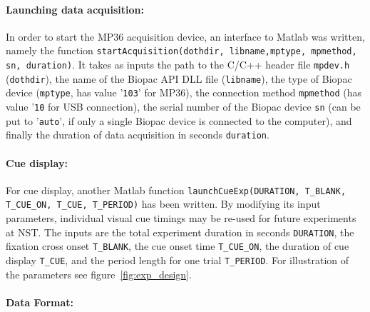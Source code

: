 \documentclass[a4paper,twoside, openright,12pt]{report}
\begin{document}
\paragraph{Launching data acquisition:} In order to start the MP36 acquisition device, an interface to Matlab was written, namely the function \texttt{startAcquisition(dothdir, libname,mptype, mpmethod, sn, duration)}. It takes as inputs the path to the C/C++ header file \texttt{mpdev.h} (\texttt{dothdir}), the name of the Biopac API DLL file (\texttt{libname}), the type of Biopac device (\texttt{mptype}, has value '\texttt{103}' for MP36), the connection method \texttt{mpmethod} (has value '\texttt{10} for USB connection), the serial number of the Biopac device \texttt{sn} (can be put to '\texttt{auto}', if only a single Biopac device is connected to the computer), and finally the duration of data acquisition in seconds \texttt{duration}. 

\paragraph{Cue display:} For cue display, another Matlab function \texttt{launchCueExp(DURATION, T\_BLANK, T\_CUE\_ON, T\_CUE, T\_PERIOD)} has been written. By modifying its input parameters, individual visual cue timings may be re-used for future experiments at NST. The inputs are the total experiment duration in seconds \texttt{DURATION}, the fixation cross onset \texttt{T\_BLANK}, the cue onset time \texttt{T\_CUE\_ON}, the duration of cue display \texttt{T\_CUE}, and the period length for one trial \texttt{T\_PERIOD}. For illustration of the parameters see figure~\ref{fig:exp_design}.

\paragraph{Data Format:}
\end{document}
